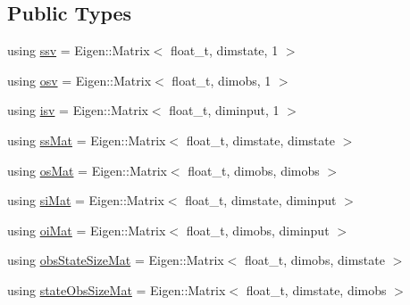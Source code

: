 \subsection*{Public Types}
\begin{DoxyCompactItemize}
\item 
using \hyperlink{classkalman_a732cf05b5ddd106cfdafc324d03f756e}{ssv} = Eigen\+::\+Matrix$<$ float\+\_\+t, dimstate, 1 $>$
\item 
using \hyperlink{classkalman_a0172e54797a5d5b0acc4168894adc6d5}{osv} = Eigen\+::\+Matrix$<$ float\+\_\+t, dimobs, 1 $>$
\item 
using \hyperlink{classkalman_abc570ce1b06e8a96a334f9226dfbce77}{isv} = Eigen\+::\+Matrix$<$ float\+\_\+t, diminput, 1 $>$
\item 
using \hyperlink{classkalman_a581550d9aba33245fb496b22a834831c}{ss\+Mat} = Eigen\+::\+Matrix$<$ float\+\_\+t, dimstate, dimstate $>$
\item 
using \hyperlink{classkalman_a28ffd71604fac7b25492b1b43379e046}{os\+Mat} = Eigen\+::\+Matrix$<$ float\+\_\+t, dimobs, dimobs $>$
\item 
using \hyperlink{classkalman_ab024c795f585385ee14aea92a5dccfbc}{si\+Mat} = Eigen\+::\+Matrix$<$ float\+\_\+t, dimstate, diminput $>$
\item 
using \hyperlink{classkalman_a35298f18f0b699f700e2d55d94bf54fc}{oi\+Mat} = Eigen\+::\+Matrix$<$ float\+\_\+t, dimobs, diminput $>$
\item 
using \hyperlink{classkalman_a13c0f71cc509326e1493982e9f23ebfc}{obs\+State\+Size\+Mat} = Eigen\+::\+Matrix$<$ float\+\_\+t, dimobs, dimstate $>$
\item 
using \hyperlink{classkalman_a44779d7ee7b8c12ca08e9dac4112906c}{state\+Obs\+Size\+Mat} = Eigen\+::\+Matrix$<$ float\+\_\+t, dimstate, dimobs $>$
\end{DoxyCompactItemize}
